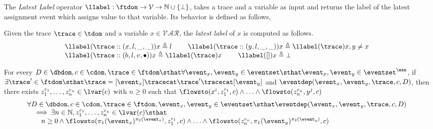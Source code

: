 The \emph{Latest Label}
operator $\llabel : \ftdom \to \mathcal{V} \to \mathbb{N} \cup \{ \bot\}$,
takes a trace and a variable as input and returns the label of the latest assignment event which assigns value to that variable. 
  Its behavior is defined as follows,
  \begin{defn}
    \label{def:latest_label}
    Given the trace $\trace \in \tdom$ and a variable $x \in \mathcal{VAR}$,
    the \emph{latest label} of $x$ is computed as follows.
    \[
      \begin{array}{l}
    \llabel(\trace  :: (x, l, \_, \_)) x \triangleq l
    \qquad~
    \llabel(\trace  :: (y, l, \_, \_)) x \triangleq \llabel(\trace ) x, y \neq x
    \\
    \llabel(\trace :: (b, l, v, \bullet)) x \triangleq \llabel(\trace) x
    \qquad~
    \llabel({[]}) x \triangleq \bot
    \end{array}
    \]
  \end{defn}

  \begin{thm}
    \label{thm:flowsto_event_soundness}
    For every $D \in \dbdom , c \in \cdom, \trace \in \ftdom \sthat  \forall \event_x, \event_y \in \eventset \sthat 
    \event_x, \event_y \in \eventset^{\asn}$, 
    if $\exists \trace' \in \ftdom \sthat  \trace = [\event_x] \tracecat \trace' \tracecat [\event_y]$ and 
    $\eventdep(\event_x, \event_y, \trace, c, D) $, then
    there exists $z_1^{r_1}, \ldots, z_n^{r_n} \in \lvar(c)$ with $n \geq 0$ such that   
    $\flowsto(x^i,  z_1^{r_1}, c) 
    \land \ldots \land \flowsto(z_n^{r_n}, y^j, c)$
    \[
      \begin{array}{l}
        \forall D \in \dbdom , c \in \cdom, \trace \in \ftdom, \event_x, \event_y \in \eventset
        \sthat 
        \eventdep(\event_x, \event_y, \trace, c, D) 
        \\ \quad 
        \implies 
        \exists n \in \mathbb{N}, z_1^{r_1}, \ldots, z_n^{r_n} \in \lvar(c) \sthat 
        \\ \qquad 
         n \geq 0 \land
        \flowsto(\pi_1(\event_x)^{\pi_2(\event_x)},  z_1^{r_1}, c) 
        \land \ldots \land \flowsto(z_n^{r_n},  \pi_1(\event_y)^{\pi_2(\event_y)}, c) 
      \end{array}
    \]
    \end{thm}
  
